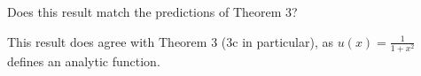 Does this result match the predictions of Theorem 3?
 

\begin{solution}
  This result does agree with Theorem 3 (3c in particular), as $u(x) = \frac{1}{1+x^2}$ defines an analytic function.
  \ \\
\end{solution}